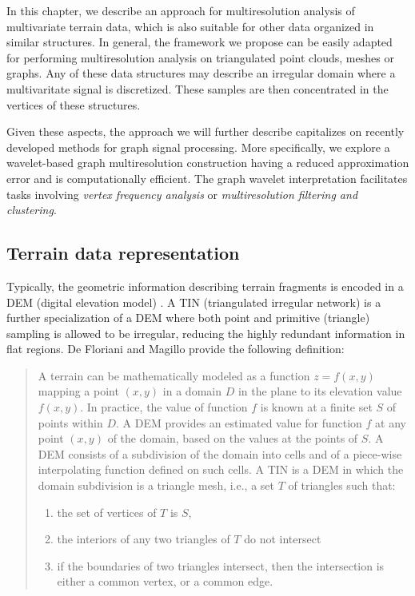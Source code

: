 \documentclass[graybox]{svmult}
\begin{document}
In this chapter, we describe an approach for multiresolution analysis of multivariate terrain data, which is also suitable for other data organized in similar structures. In general, the framework we propose can be easily adapted for performing multiresolution analysis on triangulated point clouds, meshes or graphs. Any of these data structures may describe an irregular domain where a multivaritate signal is discretized. These samples are then concentrated in the vertices of these structures.

Given these aspects, the approach we will further describe capitalizes on recently developed methods for graph signal processing. More specifically, we explore a wavelet-based graph multiresolution construction having a reduced approximation error and is computationally efficient. The graph wavelet interpretation facilitates tasks involving \emph{vertex frequency analysis} or \emph{multiresolution filtering and clustering}.


\subsection{Terrain data representation}
Typically, the geometric information describing terrain fragments is encoded in a DEM (digital elevation model) \cite{vanKreveld1997}. A TIN (triangulated irregular network) is a further
specialization of a DEM where both point and primitive (triangle) sampling is allowed to be irregular, reducing the highly redundant information in flat regions.
De Floriani and Magillo \cite{Floriani2016} provide the following definition:

\begin{quotation}
A terrain can be mathematically modeled as a function $z = f (x, y)$ mapping a point $(x, y)$ in a domain $D$ in the plane to its elevation value $f (x, y)$.
In practice, the value of function $f$ is known at a finite set $S$ of points within $D$. 
A DEM provides an estimated value for function $f$ at any point $(x, y)$ of the domain, based on the values at the points of $S$. 
A DEM consists of a subdivision of the domain into cells and of a piece-wise interpolating function defined on such cells.
A TIN is a DEM in which the domain subdivision is a triangle mesh, i.e., a set $T$ of triangles such that: 
\begin{enumerate}
	\item the set of vertices of $T$ is $S$, 
	\item the interiors of any two triangles of $T$ do not intersect
	\item if the boundaries of two triangles intersect, then the intersection is either a common vertex, or a common edge.
\end{enumerate}
\end{quotation}
\end{document}
